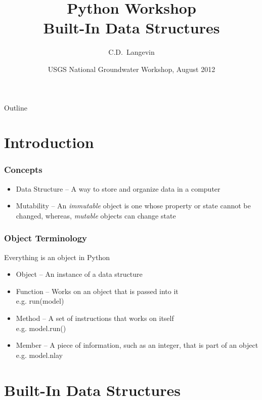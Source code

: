 \documentclass{beamer}
\title[]{Python Workshop\\
Built-In Data Structures}
\author[Langevin] %
{C.D.~Langevin}
\institute[USGS] %
{
  U.S. Geological Survey\\
  Reston, Virginia, USA
  }
\date[UQ12] %
{USGS National Groundwater Workshop, August 2012}
\begin{document}
\begin{frame}
  \titlepage
\end{frame}

\begin{frame}{Outline}
\tableofcontents
\end{frame}


\section{Introduction}
\begin{frame}[fragile]
\frametitle{Concepts}
\begin{itemize}
\item{Data Structure -- A way to store and organize data in a computer}
\item{Mutability -- An \emph{immutable} object is one whose property or state cannot be changed, whereas, \emph{mutable} objects can change state}
\end{itemize}
\end{frame}

\begin{frame}[fragile]
\frametitle{Object Terminology}
Everything is an object in Python
\begin{itemize}
\item{Object -- An instance of a data structure}
\item{Function -- Works on an object that is passed into it\\ e.g. {\color{blue}run(model)}}
\item{Method -- A set of instructions that works on itself\\ e.g. {\color{blue}model.run()}}
\item{Member -- A piece of information, such as an integer, that is part of an object\\ e.g. {\color{blue}model.nlay}}
\end{itemize}
\end{frame}


\section{Built-In Data Structures}
\end{document}
